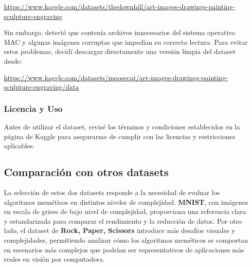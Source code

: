\url{https://www.kaggle.com/datasets/thedownhill/art-images-drawings-painting-sculpture-engraving}

Sin embargo, detecté que contenía archivos innecesarios del sistema operativo MAC y algunas imágenes corruptas que
impedían su correcta lectura.
Para evitar estos problemas, decidí descargar directamente una versión limpia del dataset desde:

\url{https://www.kaggle.com/datasets/moosecat/art-images-drawings-painting-sculpture-engraving/data}

\subsubsection{Licencia y Uso}
Antes de utilizar el dataset, revisé los términos y condiciones establecidos en la página de Kaggle para asegurarme de
cumplir con las licencias y restricciones aplicables.

\subsection{Comparación con otros datasets}\label{subsec:comparacion-con-otros-datasets}
La selección de estos dos datasets responde a la necesidad de evaluar los algoritmos meméticos en distintos niveles de
complejidad.
\textbf{MNIST}, con imágenes en escala de grises de bajo nivel de complejidad, proporciona una referencia clara y
estandarizada para comparar el rendimiento y la reducción de datos.
Por otro lado, el dataset de \textbf{Rock, Paper, Scissors} introduce más desafíos visuales y complejidades,
permitiendo analizar cómo los algoritmos meméticos se comportan en escenarios más complejos que podrían ser
representativos de aplicaciones más reales en visión por computadora.
